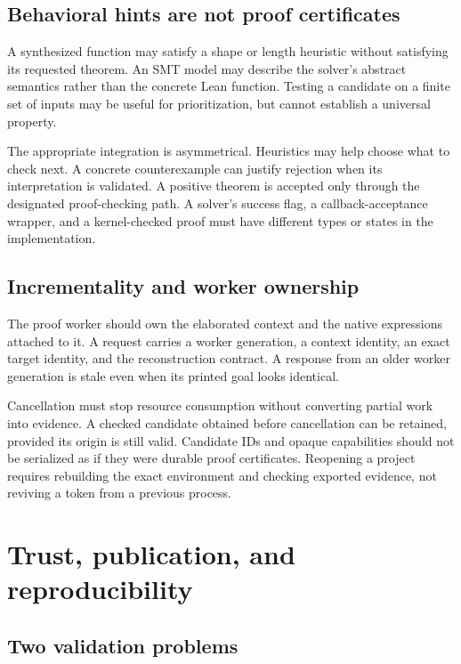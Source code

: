 \documentclass[11pt,a4paper]{article}
\theoremstyle{remark}
\begin{document}
\subsection{Behavioral hints are not proof certificates}

A synthesized function may satisfy a shape or length heuristic without satisfying its requested theorem. An SMT model may describe the solver's abstract semantics rather than the concrete Lean function. Testing a candidate on a finite set of inputs may be useful for prioritization, but cannot establish a universal property.

The appropriate integration is asymmetrical. Heuristics may help choose what to check next. A concrete counterexample can justify rejection when its interpretation is validated. A positive theorem is accepted only through the designated proof-checking path. A solver's success flag, a callback-acceptance wrapper, and a kernel-checked proof must have different types or states in the implementation.

\subsection{Incrementality and worker ownership}

The proof worker should own the elaborated context and the native expressions attached to it. A request carries a worker generation, a context identity, an exact target identity, and the reconstruction contract. A response from an older worker generation is stale even when its printed goal looks identical.

Cancellation must stop resource consumption without converting partial work into evidence. A checked candidate obtained before cancellation can be retained, provided its origin is still valid. Candidate IDs and opaque capabilities should not be serialized as if they were durable proof certificates. Reopening a project requires rebuilding the exact environment and checking exported evidence, not reviving a token from a previous process.

\section{Trust, publication, and reproducibility}\label{sec:trust}

\subsection{Two validation problems}
\end{document}
